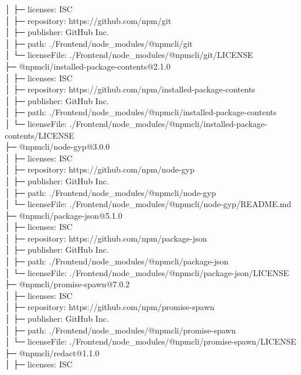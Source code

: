 │  ├─ licenses: ISC\\
│  ├─ repository: https://github.com/npm/git\\
│  ├─ publisher: GitHub Inc.\\
│  ├─ path: ./Frontend/node\_modules/@npmcli/git\\
│  └─ licenseFile: ./Frontend/node\_modules/@npmcli/git/LICENSE\\
├─ @npmcli/installed-package-contents@2.1.0\\
│  ├─ licenses: ISC\\
│  ├─ repository: https://github.com/npm/installed-package-contents\\
│  ├─ publisher: GitHub Inc.\\
│  ├─ path: ./Frontend/node\_modules/@npmcli/installed-package-contents\\
│  └─ licenseFile: ./Frontend/node\_modules/@npmcli/installed-package-contents/LICENSE\\
├─ @npmcli/node-gyp@3.0.0\\
│  ├─ licenses: ISC\\
│  ├─ repository: https://github.com/npm/node-gyp\\
│  ├─ publisher: GitHub Inc.\\
│  ├─ path: ./Frontend/node\_modules/@npmcli/node-gyp\\
│  └─ licenseFile: ./Frontend/node\_modules/@npmcli/node-gyp/README.md\\
├─ @npmcli/package-json@5.1.0\\
│  ├─ licenses: ISC\\
│  ├─ repository: https://github.com/npm/package-json\\
│  ├─ publisher: GitHub Inc.\\
│  ├─ path: ./Frontend/node\_modules/@npmcli/package-json\\
│  └─ licenseFile: ./Frontend/node\_modules/@npmcli/package-json/LICENSE\\
├─ @npmcli/promise-spawn@7.0.2\\
│  ├─ licenses: ISC\\
│  ├─ repository: https://github.com/npm/promise-spawn\\
│  ├─ publisher: GitHub Inc.\\
│  ├─ path: ./Frontend/node\_modules/@npmcli/promise-spawn\\
│  └─ licenseFile: ./Frontend/node\_modules/@npmcli/promise-spawn/LICENSE\\
├─ @npmcli/redact@1.1.0\\
│  ├─ licenses: ISC\\
